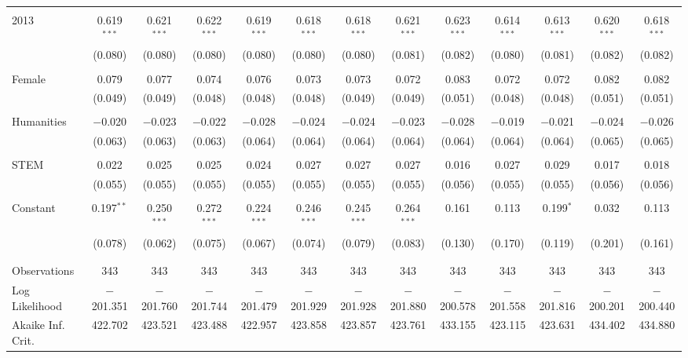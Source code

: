\begin{subtables}
\begin{table}[H]
\begin{adjustbox}{width=\textwidth}
\begin{tabular}{@{\extracolsep{5pt}}lcccccccccccc}
  & & & & & & & & & & & & \\ 
 2013 & 0.619$^{***}$ & 0.621$^{***}$ & 0.622$^{***}$ & 0.619$^{***}$ & 0.618$^{***}$ & 0.618$^{***}$ & 0.621$^{***}$ & 0.623$^{***}$ & 0.614$^{***}$ & 0.613$^{***}$ & 0.620$^{***}$ & 0.618$^{***}$ \\ 
  & (0.080) & (0.080) & (0.080) & (0.080) & (0.080) & (0.080) & (0.081) & (0.082) & (0.080) & (0.081) & (0.082) & (0.082) \\ 
  & & & & & & & & & & & & \\ 
 Female & 0.079 & 0.077 & 0.074 & 0.076 & 0.073 & 0.073 & 0.072 & 0.083 & 0.072 & 0.072 & 0.082 & 0.082 \\ 
  & (0.049) & (0.049) & (0.048) & (0.048) & (0.048) & (0.049) & (0.049) & (0.051) & (0.048) & (0.048) & (0.051) & (0.051) \\ 
  & & & & & & & & & & & & \\ 
 Humanities & $-$0.020 & $-$0.023 & $-$0.022 & $-$0.028 & $-$0.024 & $-$0.024 & $-$0.023 & $-$0.028 & $-$0.019 & $-$0.021 & $-$0.024 & $-$0.026 \\ 
  & (0.063) & (0.063) & (0.063) & (0.064) & (0.064) & (0.064) & (0.064) & (0.064) & (0.064) & (0.064) & (0.065) & (0.065) \\ 
  & & & & & & & & & & & & \\ 
 STEM & 0.022 & 0.025 & 0.025 & 0.024 & 0.027 & 0.027 & 0.027 & 0.016 & 0.027 & 0.029 & 0.017 & 0.018 \\ 
  & (0.055) & (0.055) & (0.055) & (0.055) & (0.055) & (0.055) & (0.055) & (0.056) & (0.055) & (0.055) & (0.056) & (0.056) \\ 
  & & & & & & & & & & & & \\ 
 Constant & 0.197$^{**}$ & 0.250$^{***}$ & 0.272$^{***}$ & 0.224$^{***}$ & 0.246$^{***}$ & 0.245$^{***}$ & 0.264$^{***}$ & 0.161 & 0.113 & 0.199$^{*}$ & 0.032 & 0.113 \\ 
  & (0.078) & (0.062) & (0.075) & (0.067) & (0.074) & (0.079) & (0.083) & (0.130) & (0.170) & (0.119) & (0.201) & (0.161) \\ 
  & & & & & & & & & & & & \\ 
\hline \\[-1.8ex] 
Observations & 343 & 343 & 343 & 343 & 343 & 343 & 343 & 343 & 343 & 343 & 343 & 343 \\ 
Log Likelihood & $-$201.351 & $-$201.760 & $-$201.744 & $-$201.479 & $-$201.929 & $-$201.928 & $-$201.880 & $-$200.578 & $-$201.558 & $-$201.816 & $-$200.201 & $-$200.440 \\ 
Akaike Inf. Crit. & 422.702 & 423.521 & 423.488 & 422.957 & 423.858 & 423.857 & 423.761 & 433.155 & 423.115 & 423.631 & 434.402 & 434.880 \\ 

\end{tabular}
\end{adjustbox}
\end{table}
\end{subtables}
